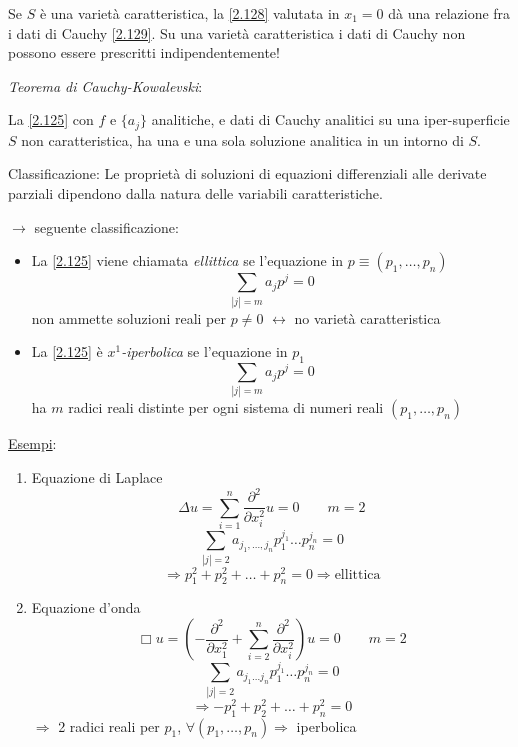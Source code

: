 \documentclass[a4paper,11pt]{report}
\begin{document}
Se $S$ \`e una variet\`a caratteristica, la \eqref{2.128} valutata in $x_1=0$ d\`a una relazione fra i dati di Cauchy \eqref{2.129}. Su una variet\`a caratteristica i dati di Cauchy non possono essere prescritti indipendentemente!

\medskip

\emph{Teorema di Cauchy-Kowalevski}:

La \eqref{2.125} con $f$ e $\{a_j\}$ analitiche, e dati di Cauchy analitici su una iper-superficie $S$ non caratteristica, ha una e una sola soluzione analitica in un intorno di $S$.

\medskip

Classificazione: Le propriet\`a di soluzioni di equazioni differenziali alle derivate parziali dipendono dalla natura delle variabili caratteristiche.

$\rightarrow$ seguente classificazione:
\begin{itemize}
\item La \eqref{2.125} viene chiamata \emph{ellittica} se l'equazione in $p \equiv (p_1,\dots,p_n)$
\[
\sum_{|j|=m}a_jp^j=0
\]
non ammette soluzioni reali per $p\neq 0$ $\leftrightarrow$ no variet\`a caratteristica
\item La \eqref{2.125} \`e \emph{$x^1$-iperbolica} se l'equazione in $p_1$
\[
\sum_{|j|=m}a_jp^j=0
\]
ha $m$ radici reali distinte per ogni sistema di numeri reali $(p_1,\dots,p_n)$
\end{itemize}

\underline{Esempi}:
\begin{enumerate}[label=(\roman*)]
\item Equazione di Laplace
\[
\Delta u=\sum_{i=1}^n\frac{\partial^2}{\partial x_i^2}u=0 \qquad m=2
\]
\[
\sum_{|j|=2} a_{j_1,\dots,j_n}p_1^{j_1}\dots p^{j_n}_n=0
\]
\[
\Rightarrow p_1^2 + p_2^2 + \dots + p_n^2 =0 \Rightarrow \text{ellittica}
\]
\item Equazione d'onda
\[
\Box u =\left(-\frac{\partial^2}{\partial x_1^2}+\sum_{i=2}^n\frac{\partial^2}{\partial x_i^2} \right)u=0 \qquad m=2
\]
\[
\sum_{|j|=2} a_{j_1 \dots j_n}p_1^{j_1} \dots p_n^{j_n}=0
\]
\[
\Rightarrow -p_1^2 + p_2^2 + \ldots + p_n^2=0
\]
$ \Rightarrow$ 2 radici reali per $p_1$, $\forall (p_1,\ldots,p_n) \Rightarrow$ iperbolica
\end{enumerate}
\end{document}

